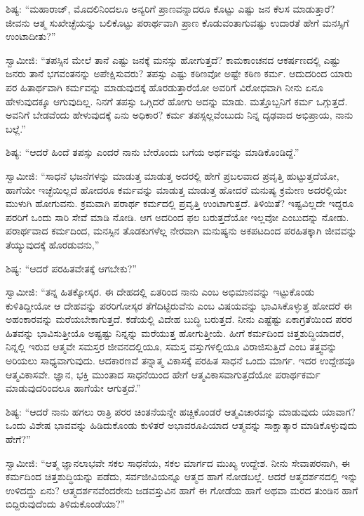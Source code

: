  ಶಿಷ್ಯ: “ಮಹಾರಾಜ್, ಮೊದಲಿನಿಂದಲೂ ಅನ್ಯರಿಗೆ ಪ್ರಾಣವನ್ನಾದರೂ ಕೊಟ್ಟು ಎಷ್ಟು ಜನ ಕೆಲಸ ಮಾಡುತ್ತಾರೆ? ಜೀವನು ಆತ್ಮ ಸುಖೇಚ್ಛೆಯನ್ನು ಬಲಿಕೊಟ್ಟು ಪರಾರ್ಥವಾಗಿ ಪ್ರಾಣ ಕೊಡುವಂತಾಗುವಷ್ಟು ಉದಾರತೆ ಹೇಗೆ ಮನಸ್ಸಿಗೆ ಉಂಟಾದೀತು?” 

 ಸ್ವಾಮೀಜಿ: “ತಪಸ್ಸಿನ ಮೇಲೆ ತಾನೆ ಎಷ್ಟು ಜನಕ್ಕೆ ಮನಸ್ಸು ಹೋಗುತ್ತದೆ? ಕಾಮಕಾಂಚನದ ಆಕರ್ಷಣದಲ್ಲಿ ಎಷ್ಟು ಜನರು ತಾನೆ ಭಗವಂತನನ್ನು ಅಪೇಕ್ಷಿಸುವರು? ತಪಸ್ಸು ಎಷ್ಟು ಕಠಿಣವೋ ಅಷ್ಟೇ ಕಠಿಣ ಕರ್ಮ. ಆದುದರಿಂದ ಯಾರು ಪರ ಹಿತಾರ್ಥವಾಗಿ ಕರ್ಮವನ್ನು ಮಾಡುವುದಕ್ಕೆ ಹೊರಡುತ್ತಾರೆಯೋ ಅವರಿಗೆ ವಿರೋಧವಾಗಿ ನೀನು ಏನೂ ಹೇಳುವುದಕ್ಕೂ ಆಗುವುದಿಲ್ಲ. ನಿನಗೆ ತಪಸ್ಸು ಒಗ್ಗಿದರೆ ಹೋಗು ಅದನ್ನು ಮಾಡು. ಮತ್ತೊಬ್ಬನಿಗೆ ಕರ್ಮ ಒಗ್ಗುತ್ತದೆ. ಅವನಿಗೆ ಬೇಡವೆಂದು ಹೇಳುವುದಕ್ಕೆ ಏನು ಅಧಿಕಾರ? ಕರ್ಮ ತಪಸ್ಸಲ್ಲವೆಂಬುದು ನಿನ್ನ ದೃಢವಾದ ಅಭಿಪ್ರಾಯ, ನಾನು ಬಲ್ಲೆ.” 

 ಶಿಷ್ಯ: “ಆದರೆ ಹಿಂದೆ ತಪಸ್ಸು ಎಂದರೆ ನಾನು ಬೇರೊಂದು ಬಗೆಯ ಅರ್ಥವನ್ನು ಮಾಡಿಕೊಂಡಿದ್ದೆ.” 

 ಸ್ವಾಮೀಜಿ: “ಸಾಧನೆ ಭಜನೆಗಳನ್ನು ಮಾಡುತ್ತ ಮಾಡುತ್ತ ಅದರಲ್ಲಿ ಹೇಗೆ ಪ್ರಬಲವಾದ ಪ್ರವೃತ್ತಿ ಹುಟ್ಟುತ್ತದೆಯೋ, ಹಾಗೆಯೇ ಇಚ್ಛೆಯಿಲ್ಲದೆ ಹೋದರೂ ಕರ್ಮವನ್ನು ಮಾಡುತ್ತ ಮಾಡುತ್ತ ಹೋದರೆ ಮನುಷ್ಯ ಕ್ರಮೇಣ ಅದರಲ್ಲಿಯೇ ಮುಳುಗಿ ಹೋಗುವನು. ಕ್ರಮವಾಗಿ ಪರಾರ್ಥ ಕರ್ಮದಲ್ಲಿ ಪ್ರವೃತ್ತಿ ಉಂಟಾಗುತ್ತದೆ. ತಿಳಿಯಿತೆ? ಇಷ್ಟವಿಲ್ಲದೇ ಇದ್ದರೂ ಪರರಿಗೆ ಒಂದು ಸಾರಿ ಸೇವೆ ಮಾಡಿ ನೋಡಿ. ಆಗ ಅದರಿಂದ ಫಲ ಬರುತ್ತದೆಯೋ ಇಲ್ಲವೋ ಎಂಬುದನ್ನು ನೋಡು. ಪರಾರ್ಥವಾದ ಕರ್ಮದಿಂದ, ಮನಸ್ಸಿನ ತೊಡಕುಗಳೆಲ್ಲ ನೇರವಾಗಿ ಮನುಷ್ಯನು ಅಕಪಟದಿಂದ ಪರಹಿತಕ್ಕಾಗಿ ಜೀವವನ್ನು ತೆಯ್ಯುವುದಕ್ಕೆ ಹೊರಡುವನು,” 

 ಶಿಷ್ಯ: “ಆದರೆ ಪರಹಿತವೇತಕ್ಕೆ ಆಗಬೇಕು?” 

 ಸ್ವಾಮೀಜಿ: “ತನ್ನ ಹಿತಕ್ಕೋಸ್ಕರ. ಈ ದೇಹದಲ್ಲಿ ಏತರಿಂದ ನಾನು ಎಂಬ ಅಭಿಮಾನವನ್ನು ಇಟ್ಟುಕೊಂಡು ಕುಳಿತಿದ್ದೀಯೋ ಆ ದೇಹವನ್ನು ಪರರಿಗೋಸ್ಕರ ತೆಗೆದಿಟ್ಟಿರುವೆನು ಎಂಬ ವಿಷಯವನ್ನು ಭಾವಿಸಿಕೊಳ್ಳುತ್ತ ಹೋದರೆ ಈ ಅಹಂಕಾರವನ್ನು ಮರೆಯಬೇಕಾಗುತ್ತದೆ. ಕಡೆಯಲ್ಲಿ ವಿದೇಹ ಬುದ್ಧಿ ಬರುತ್ತದೆ. ನೀನು ಎಷ್ಟೆಷ್ಟು ಏಕಾಗ್ರತೆಯಿಂದ ಪರರ ಹಿತವನ್ನು ಭಾವಿಸುತ್ತೀಯೊ ಅಷ್ಟಷ್ಟು ನಿನ್ನನ್ನು ಮರೆಯುತ್ತ ಹೋಗುತ್ತೀಯೆ. ಹೀಗೆ ಕರ್ಮದಿಂದ ಚಿತ್ತಶುದ್ಧಿಯಾದರೆ, ನಿನ್ನಲ್ಲಿ ಇರುವ ಆತ್ಮವೇ ಸಮಸ್ತರ ಜೀವನದಲ್ಲಿಯೂ, ಸಮಸ್ತ ವಸ್ತುಗಳಲ್ಲಿಯೂ ವಿರಾಜಿಸುತ್ತಿದೆ ಎಂಬ ತತ್ತ್ವವನ್ನು ಅರಿಯಲು ಸಾಧ್ಯವಾಗುವುದು. ಆದಕಾರಣವೆ ತನ್ನಾತ್ಮ ವಿಕಾಸಕ್ಕೆ ಪರಹಿತ ಸಾಧನೆ ಒಂದು ಮಾರ್ಗ. ಇದರ ಉದ್ದೇಶವೂ ಆತ್ಮವಿಕಾಸವೇ. ಜ್ಞಾನ, ಭಕ್ತಿ ಮುಂತಾದ ಸಾಧನೆಯಿಂದ ಹೇಗೆ ಆತ್ಮವಿಕಾಸವಾಗುತ್ತದೆಯೋ ಪರಾರ್ಥಕರ್ಮ ಮಾಡುವುದರಿಂದಲೂ ಹಾಗೆಯೇ ಆಗುತ್ತದೆ.” 

 ಶಿಷ್ಯ: “ಆದರೆ ನಾನು ಹಗಲು ರಾತ್ರಿ ಪರರ ಚಿಂತನೆಯನ್ನೇ ಹಚ್ಚಿಕೊಂಡರೆ ಆತ್ಮವಿಚಾರವನ್ನು ಮಾಡುವುದು ಯಾವಾಗ? ಒಂದು ವಿಶೇಷ ಭಾವವನ್ನು ಹಿಡಿದುಕೊಂಡು ಕುಳಿತರೆ ಅಭಾವರೂಪಿಯಾದ ಆತ್ಮವನ್ನು ಸಾಕ್ಷಾತ್ಕಾರ ಮಾಡಿಕೊಳ್ಳುವುದು ಹೇಗೆ?” 

 ಸ್ವಾಮೀಜಿ: “ಆತ್ಮ ಜ್ಞಾನಲಾಭವೇ ಸಕಲ ಸಾಧನೆಯ, ಸಕಲ ಮಾರ್ಗದ ಮುಖ್ಯ ಉದ್ದೇಶ. ನೀನು ಸೇವಾಪರನಾಗಿ, ಈ ಕರ್ಮದಿಂದ ಚಿತ್ತಶುದ್ಧಿಯನ್ನು ಪಡೆದು, ಸರ್ವಜೀವಿಯನ್ನೂ ಆತ್ಮದ ಹಾಗೆ ನೋಡಬಲ್ಲೆ. ಆದರೆ ಆತ್ಮದರ್ಶನದಲ್ಲಿ ಇನ್ನು ಉಳಿದದ್ದು ಏನು? ಆತ್ಮದರ್ಶನವೆಂದರೇನು ಜಡವಸ್ತುವಿನ ಹಾಗೆ ಈ ಗೋಡೆಯ ಹಾಗೆ ಅಥವಾ ಮರದ ತುಂಡಿನ ಹಾಗೆ ಬಿದ್ದಿರುವುದೆಂದು ತಿಳಿದುಕೊಂಡೆಯಾ?” 

